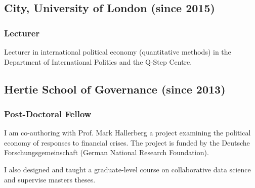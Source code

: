 \documentclass[a4paper]{article}
\begin{document}
\subsection*{City, University of London (since 2015)}

\subsubsection*{Lecturer}

Lecturer in international political economy (quantitative methods) in the Department of International Politics and the Q-Step Centre.

\subsection*{Hertie School of Governance (since 2013)}

\subsubsection*{Post-Doctoral Fellow}

I am co-authoring with Prof. Mark Hallerberg a project examining the political economy of responses to financial crises. The project is funded by the Deutsche Forschungsgemeinschaft (German National Research Foundation).\vspace{0.25cm}

\noindent I also designed and taught a graduate-level course on collaborative data science and supervise masters theses.
\end{document}
